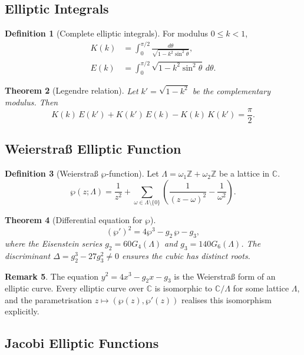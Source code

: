 \documentclass[12pt,a4paper]{amsart}
\newtheorem{theorem}{Theorem}[section]
\theoremstyle{definition}
\newtheorem{definition}[theorem]{Definition}
\newtheorem{remark}[theorem]{Remark}
\begin{document}
\subsection{Elliptic Integrals}

\begin{definition}[Complete elliptic integrals]
For modulus \(0 \leq k < 1\),
\begin{align*}
  K(k) &= \int_0^{\pi/2}\frac{d\theta}{\sqrt{1-k^2\sin^2\theta}}, \\
  E(k) &= \int_0^{\pi/2}\sqrt{1-k^2\sin^2\theta}\,d\theta.
\end{align*}
\end{definition}

\begin{theorem}[Legendre relation]
Let \(k' = \sqrt{1-k^2}\) be the complementary modulus.  Then
\[
  K(k)\,E(k') + K(k')\,E(k) - K(k)\,K(k') = \frac{\pi}{2}.
\]
\end{theorem}

\subsection{Weierstra\ss{} Elliptic Function}

\begin{definition}[Weierstra\ss{} \(\wp\)-function]
Let \(\Lambda = \omega_1\mathbb{Z} + \omega_2\mathbb{Z}\) be a lattice in \(\mathbb{C}\).
\[
  \wp(z; \Lambda) = \frac{1}{z^2}
  + \sum_{\omega \in \Lambda\setminus\{0\}} \left(\frac{1}{(z-\omega)^2} - \frac{1}{\omega^2}\right).
\]
\end{definition}

\begin{theorem}[Differential equation for \(\wp\)]
\[
  (\wp')^2 = 4\wp^3 - g_2\,\wp - g_3,
\]
where the Eisenstein series \(g_2 = 60 G_4(\Lambda)\) and \(g_3 = 140 G_6(\Lambda)\).
The discriminant \(\Delta = g_2^3 - 27g_3^2 \neq 0\) ensures the cubic has distinct roots.
\end{theorem}

\begin{remark}
The equation \(y^2 = 4x^3 - g_2 x - g_3\) is the Weierstra\ss{} form of an elliptic
curve.  Every elliptic curve over \(\mathbb{C}\) is isomorphic to \(\mathbb{C}/\Lambda\)
for some lattice \(\Lambda\), and the parametrisation \(z \mapsto (\wp(z), \wp'(z))\)
realises this isomorphism explicitly.
\end{remark}

\subsection{Jacobi Elliptic Functions}
\end{document}
